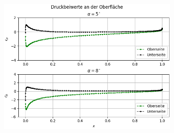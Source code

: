 \begin{figure}[!ht]
\begin{subfigure}[b]{0.475\linewidth}
  \end{subfigure}
  \hfill
  \begin{subfigure}[b]{0.475\linewidth}
    \centering\includegraphics[scale=0.4]{figures/nacacplines.png} 
  \end{subfigure}
  
\end{figure}

\newpage
